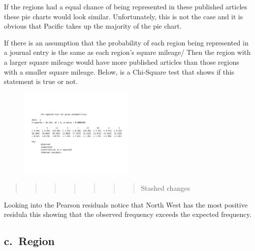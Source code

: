 \documentclass[
]{article}
\begin{document}
If the regions had a equal chance of being represented in these
published articles these pie charts would look similar. Unfortunately,
this is not the case and it is obvious that Pacific takes up the
majority of the pie chart.

If there is an assumption that the probability of each region being
represented in a journal entry is the same as each region's square
mileage/ Then the region with a larger square mileage would have more
published articles than those regions with a smaller square mileage.
Below, is a Chi-Square test that shows if this statement is true or not.

\begin{figure}
    \centering
    \includegraphics[width=0.50\textwidth]{RegionChiSquare2.pdf}
    \label{fig:Region XChi-Square}
\end{figure}

\begin{quote}
\begin{quote}
\begin{quote}
\begin{quote}
\begin{quote}
\begin{quote}
\begin{quote}
Stashed changes
\end{quote}
\end{quote}
\end{quote}
\end{quote}
\end{quote}
\end{quote}
\end{quote}

Looking into the Pearson residuals notice that North West has the most
positive residula this showing that the observed frequency exceeds the
expected frequency.

\hypertarget{c.-region}{%
\subsection{c.~Region}\label{c.-region}}
\end{document}

